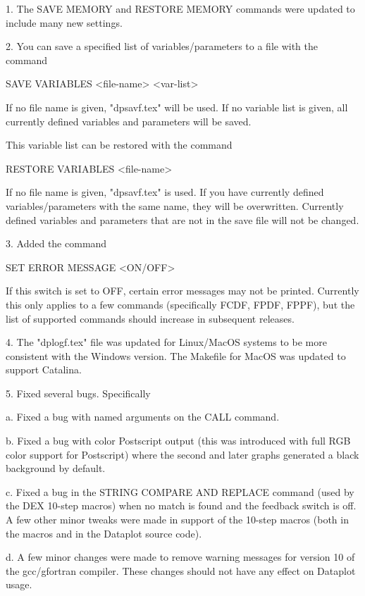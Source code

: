  1. The SAVE MEMORY and RESTORE MEMORY commands were updated to
    include many new settings.

 2. You can save a specified list of variables/parameters to a
    file with the command

        SAVE VARIABLES <file-name> <var-list>

    If no file name is given, "dpsavf.tex" will be used.  If
    no variable list is given, all currently defined variables
    and parameters will be saved.

    This variable list can be restored with the command

        RESTORE VARIABLES <file-name>

    If no file name is given, "dpsavf.tex" is used.  If you
    have currently defined variables/parameters with the same
    name, they will be overwritten.  Currently defined variables
    and parameters that are not in the save file will not be
    changed.

 3. Added the command

        SET ERROR MESSAGE <ON/OFF>

    If this switch is set to OFF, certain error messages may not
    be printed.  Currently this only applies to a few commands
    (specifically FCDF, FPDF, FPPF), but the list of supported commands
    should increase in subsequent releases.

 4. The "dplogf.tex" file was updated for Linux/MacOS systems to be more
    consistent with the Windows version.  The Makefile for MacOS was
    updated to support Catalina.

 5. Fixed several bugs.  Specifically

    a. Fixed a bug with named arguments on the CALL command.

    b. Fixed a bug with color Postscript output (this was introduced
       with full RGB color support for Postscript) where the second
       and later graphs generated a black background by default.

    c. Fixed a bug in the STRING COMPARE AND REPLACE command (used
       by the DEX 10-step macros) when no match is found and the
       feedback switch is off.  A few other minor tweaks were made
       in support of the 10-step macros (both in the macros and in
       the Dataplot source code).

    d. A few minor changes were made to remove warning messages for
       version 10 of the gcc/gfortran compiler.  These changes should
       not have any effect on Dataplot usage.

